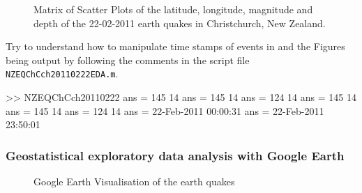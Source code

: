 \begin{figure}[htpb]
\caption{Matrix of Scatter Plots of the latitude, longitude, magnitude and depth of the 22-02-2011 earth quakes in Christchurch, New Zealand.\label{F:NZEQ20110222ChchLtLnMgDpScatterMatrixPlot}}
\centering   {}
\end{figure}


\begin{labwork}\label{LW:NZEQChCch20110222EDA}
Try to understand how to manipulate time stamps of events in \Matlab and the Figures being output by following the comments in the script file {\tt NZEQChCch20110222EDA.m}.
\begin{VrbM}
>> NZEQChCch20110222
ans =   145    14
ans =   145    14
ans =   124    14
ans =   145    14
ans =   145    14
ans =   124    14
ans = 22-Feb-2011 00:00:31
ans = 22-Feb-2011 23:50:01
\end{VrbM}
\end{labwork}

\subsubsection{Geostatistical exploratory data analysis with Google Earth}

\begin{figure}[htpb]
\caption{Google Earth Visualisation of the earth quakes\label{F:NZEQ20110222ChchLtLnMgDpInGoogleEarthViewFromUSGS}}
\centering   {}
\end{figure}

